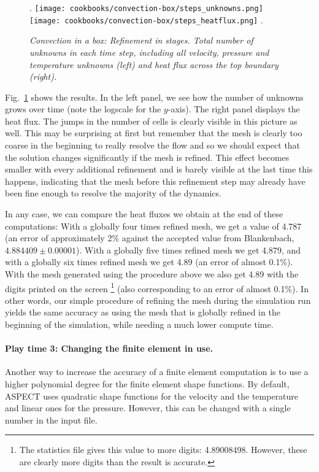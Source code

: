 \documentclass{article}
\newcommand{\aspect}{\textsc{ASPECT}}
\begin{document}
\begin{figure}
\phantom.
\hfill
\texttt{[image: cookbooks/convection-box/steps\_unknowns.png]}
\hfill
\texttt{[image: cookbooks/convection-box/steps\_heatflux.png]}
\hfill
\phantom.
\caption{\it Convection in a box: Refinement in stages. Total number
of unknowns in each time step, including all velocity, pressure and
temperature unknowns (left) and heat flux across the top boundary (right).}
\label{fig:convection-box-stats-steps}
\end{figure}


Fig.~\ref{fig:convection-box-stats-steps} shows the results. In the left panel,
we see how the number of unknowns grows over time (note the logscale for the
$y$-axis). The right panel displays the heat flux. The jumps in the number of
cells is clearly visible in this picture as well. This may be surprising at
first but remember that the mesh is clearly too coarse in the beginning to
really resolve the flow and so we should expect that the solution changes
significantly if the mesh is refined. This effect becomes smaller with every
additional refinement and is barely visible at the last time this happens,
indicating that the mesh before this refinement step may already have been fine
enough to resolve the majority of the dynamics.

In any case, we can compare the heat fluxes we obtain at the end of these
computations: With a globally four times refined mesh, we get a value of 4.787
(an error of approximately 2\% against the accepted value from Blankenbach,
$4.884409\pm 0.00001$). With a globally five times refined mesh we get 4.879, 
and with a globally six times refined mesh we get 4.89 (an error of almost 0.1\%).
With the mesh generated using the procedure above we also get
4.89 with the digits printed on the screen%
\footnote{The statistics file gives this
value to more digits: 4.89008498. However, these are clearly more digits than
the result is accurate.}
(also corresponding to an error of almost 0.1\%). In other words, our
simple procedure of refining the mesh during the simulation run yields the same 
accuracy as using the mesh that is globally refined in the beginning of the 
simulation, while needing a much lower compute time.  


\paragraph{Play time 3: Changing the finite element in use.}
Another way to increase the accuracy of a finite element computation is to use a
higher polynomial degree for the finite element shape functions. By default,
\aspect{} uses quadratic shape functions for the velocity and the temperature
and linear ones for the pressure. However, this can be changed with a single
number in the input file.
\end{document}
